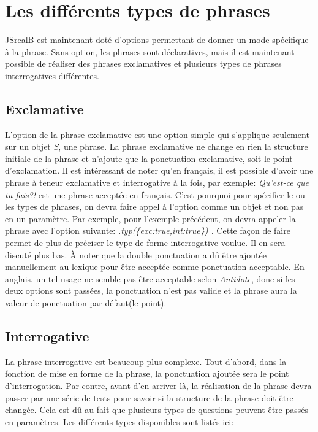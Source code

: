 \documentclass[11pt]{article} %
\newcommand{\system}[1]{\textsf{#1}}
\newcommand{\JSB}{\system{JSrealB}}
\begin{document}
\section{Les différents types de phrases}
\JSB{} est maintenant doté d'options permettant de donner un mode
spécifique à la phrase. Sans option, les phrases sont déclaratives,
mais il est maintenant possible de réaliser des phrases exclamatives
et plusieurs types de phrases interrogatives différentes. 

\subsection{Exclamative}

L'option de la phrase exclamative est une option simple qui s'applique
seulement sur un objet \emph{S}, une phrase. La phrase exclamative
ne change en rien la structure initiale de la phrase et n'ajoute que
la ponctuation exclamative, soit le point d'exclamation. Il est intéressant
de noter qu'en français, il est possible d'avoir une phrase à teneur
exclamative et interrogative à la fois, par exemple: \emph{Qu'est-ce
que tu fais?!} est une phrase acceptée en français. C'est pourquoi
pour spécifier le ou les types de phrases, on devra faire appel à
l'option comme un objet et non pas en un paramètre. Par exemple, pour
l'exemple précédent, on devra appeler la phrase avec l'option suivante:
\emph{.typ(\{exc:true,int:true\}) . }Cette façon de faire permet de
plus de préciser le type de forme interrogative voulue. Il en sera
discuté plus bas. À noter que la double ponctuation a dû être ajoutée
manuellement au lexique pour être acceptée comme ponctuation acceptable.
En anglais, un tel usage ne semble pas être acceptable selon \emph{Antidote},
donc si les deux options sont passées, la ponctuation n'est pas valide
et la phrase aura la valeur de ponctuation par défaut(le point).

\subsection{Interrogative}
\label{question}

La phrase interrogative est beaucoup plus complexe.
Tout d'abord, dans la fonction de mise en forme de la phrase, la
ponctuation ajoutée sera le point d'interrogation. Par contre, avant
d'en arriver là, la réalisation de la phrase devra passer par une
série de tests pour savoir si la structure de la phrase doit être
changée. Cela est dû au fait que plusieurs types de questions peuvent
être passés en paramètres. Les différents types disponibles sont listés
ici:
\end{document}
